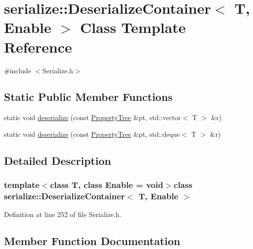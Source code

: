 \hypertarget{classserialize_1_1_deserialize_container}{}\section{serialize\+:\+:Deserialize\+Container$<$ T, Enable $>$ Class Template Reference}
\label{classserialize_1_1_deserialize_container}


{\ttfamily \#include $<$Serialize.\+h$>$}

\subsection*{Static Public Member Functions}
\begin{DoxyCompactItemize}
\item 
static void \hyperlink{classserialize_1_1_deserialize_container_a81bdeaff0ef56f203cc65b1d0691c471}{deserialize} (const \hyperlink{namespacesolar__core_adeda2737d6938c190eb774a5b2495045}{Property\+Tree} \&pt, std\+::vector$<$ T $>$ \&r)
\item 
static void \hyperlink{classserialize_1_1_deserialize_container_a393ffc783bcb56715d088fd615d9fe3e}{deserialize} (const \hyperlink{namespacesolar__core_adeda2737d6938c190eb774a5b2495045}{Property\+Tree} \&pt, std\+::deque$<$ T $>$ \&r)
\end{DoxyCompactItemize}


\subsection{Detailed Description}
\subsubsection*{template$<$class T, class Enable = void$>$class serialize\+::\+Deserialize\+Container$<$ T, Enable $>$}



Definition at line 252 of file Serialize.\+h.



\subsection{Member Function Documentation}
\hypertarget{classserialize_1_1_deserialize_container_a81bdeaff0ef56f203cc65b1d0691c471}{}
